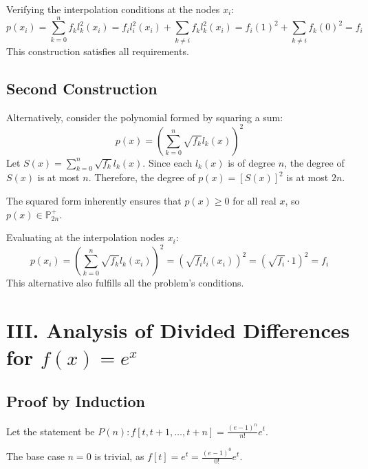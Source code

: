 \documentclass[a4paper]{article}
\begin{document}
Verifying the interpolation conditions at the nodes $x_i$:
\[
p(x_i) = \sum_{k=0}^{n} f_k l_k^2(x_i) = f_i l_i^2(x_i) + \sum_{k \neq i} f_k l_k^2(x_i) = f_i (1)^2 + \sum_{k \neq i} f_k (0)^2 = f_i
\]
This construction satisfies all requirements.

\subsection*{Second Construction}

Alternatively, consider the polynomial formed by squaring a sum:
\[
p(x) = \left( \sum_{k=0}^{n} \sqrt{f_k} l_k(x) \right)^2
\]
Let $S(x) = \sum_{k=0}^{n} \sqrt{f_k} l_k(x)$. Since each $l_k(x)$ is of degree $n$, the degree of $S(x)$ is at most $n$. Therefore, the degree of $p(x) = [S(x)]^2$ is at most $2n$.

The squared form inherently ensures that $p(x) \ge 0$ for all real $x$, so $p(x) \in \mathbb{P}_{2n}^+$.

Evaluating at the interpolation nodes $x_i$:
\[
p(x_i) = \left( \sum_{k=0}^{n} \sqrt{f_k} l_k(x_i) \right)^2 = \left( \sqrt{f_i} l_i(x_i) \right)^2 = \left( \sqrt{f_i} \cdot 1 \right)^2 = f_i
\]
This alternative also fulfills all the problem's conditions.




\section*{III. Analysis of Divided Differences for $f(x)=e^x$}

\subsection*{Proof by Induction}

Let the statement be $P(n): f[t, t+1, \dots, t+n] = \frac{(e-1)^n}{n!}e^t$.

The base case $n=0$ is trivial, as $f[t] = e^t = \frac{(e-1)^0}{0!}e^t$.
\end{document}
